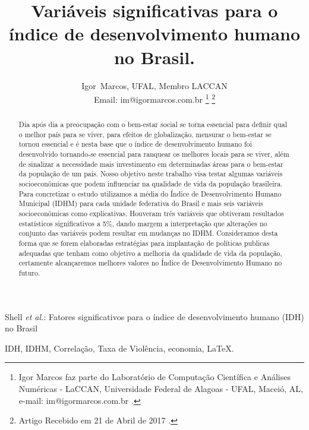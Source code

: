 \documentclass[journal]{IEEEtran}
\begin{document}
\title{Variáveis significativas para o índice de desenvolvimento humano no Brasil.}
\author{Igor~Marcos, UFAL, Membro LACCAN\\
Email: im@igormarcos.com.br
\thanks{Igor Marcos faz parte do Laboratório de Computação Científica e Análises Numéricas - LaCCAN, Universidade Federal de Alagoas - UFAL, Maceió,
AL, e-mail: im@igormarcos.com.br .}
\thanks{Artigo Recebido em 21 de Abril de 2017%
.}}

{Shell \MakeLowercase{\textit{et al.}}: Fatores significativos para o índice de desenvolvimento humano (IDH) no Brasil}

\maketitle
\begin{abstract}
Dia após dia a preocupação com o bem-estar social se torna essencial para definir qual o melhor país para se viver, para efeitos de globalização, mensurar o bem-estar se tornou essencial e é nesta base que o índice de desenvolvimento humano foi desenvolvido tornando-se essencial para ranquear os melhores locais para se viver, além de sinalizar a necessidade mais investimento em determinadas áreas para o bem-estar da população de um país. Nosso objetivo neste trabalho visa testar algumas variáveis socioeconômicas que podem influenciar na qualidade de vida da população brasileira. Para concretizar o estudo utilizamos a média do Índice de Desenvolvimento Humano Municipal (IDHM) para cada unidade federativa do Brasil e mais seis variáveis socioeconômicas como explicativas.
Houveram três variáveis que obtiveram resultados estatísticos significativos a 5\%, dando margem a interpretação que alterações no conjunto das variáveis podem resultar em mudanças no IDHM. Consideramos desta forma que se forem elaboradas estratégias para implantação de políticas publicas adequadas que tenham como objetivo a melhoria da qualidade de vida da população, certamente alcançaremos melhores valores no Índice de Desenvolvimento Humano no futuro.
\end{abstract}

\begin{IEEEkeywords}
IDH, IDHM, Correlação, Taxa de Violência, economia, \LaTeX.
\end{IEEEkeywords}
\IEEEpeerreviewmaketitle
\end{document}
